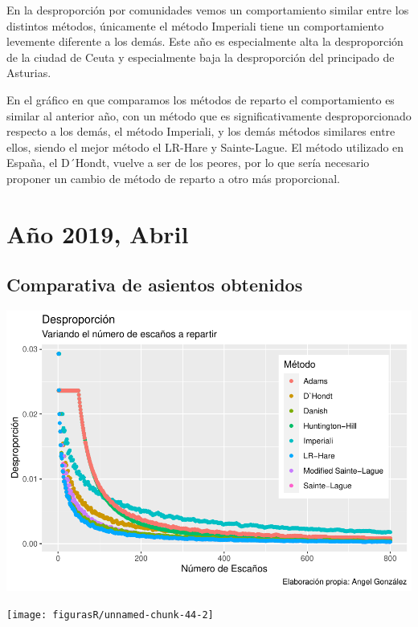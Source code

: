 \documentclass[12pt,a4paper,]{book}
\numberwithin{dummy}{section}
\theoremstyle{ocrenumbox}
\theoremstyle{blacknumex}
\theoremstyle{blacknumbox}
\theoremstyle{ocrenum}
\theoremstyle{ocrenum}
\begin{document}
En la desproporción por comunidades vemos un comportamiento similar
entre los distintos métodos, únicamente el método Imperiali tiene un
comportamiento levemente diferente a los demás. Este año es
especialmente alta la desproporción de la ciudad de Ceuta y
especialmente baja la desproporción del principado de Asturias.

En el gráfico en que comparamos los métodos de reparto el comportamiento
es similar al anterior año, con un método que es significativamente
desproporcionado respecto a los demás, el método Imperiali, y los demás
métodos similares entre ellos, siendo el mejor método el LR-Hare y
Sainte-Lague. El método utilizado en España, el D´Hondt, vuelve a ser de
los peores, por lo que sería necesario proponer un cambio de método de
reparto a otro más proporcional.

\hypertarget{auxf1o-2019-abril}{%
\section{Año 2019, Abril}\label{auxf1o-2019-abril}}

\hypertarget{comparativa-de-asientos-obtenidos-13}{%
\subsection{Comparativa de asientos
obtenidos}\label{comparativa-de-asientos-obtenidos-13}}

\begin{center}\includegraphics[width=1\linewidth]{figurasR/unnamed-chunk-44-1} \end{center}

\begin{center}\texttt{[image: figurasR/unnamed-chunk-44-2]} \end{center}
\end{document}

